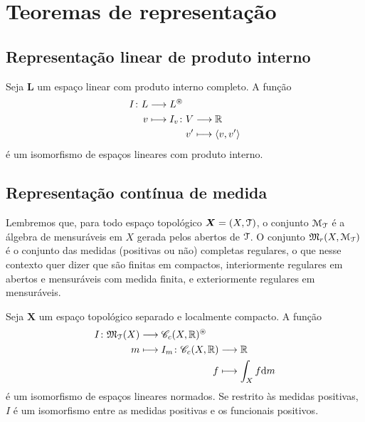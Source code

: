 \section{Teoremas de representação}

\subsection{Representação linear de produto interno}

\begin{proposition}
Seja $\bm L$ um espaço linear com produto interno completo. A função
	\begin{align*}
	\func{I}{L}{L^\circledast}{v}{
		\begin{aligned}[t]
		\func{I_v}{V}{\R}{v'}{\inte{v}{v'}}
		\end{aligned}
	}
	\end{align*}
é um isomorfismo de espaços lineares com produto interno.
\end{proposition}

\subsection{Representação contínua de medida}

Lembremos que, para todo espaço topológico $\bm X = (X,\mathcal{T})$, o conjunto $\mathcal{M}_{\mathcal{T}}$ é a álgebra de mensuráveis em $X$ gerada pelos abertos de $\mathcal{T}$. O conjunto $\mathfrak{M}_r(X,\mathcal{M}_{\mathcal{T}})$ é o conjunto das medidas (positivas ou não) completas regulares, o que nesse contexto quer dizer que são finitas em compactos, interiormente regulares em abertos e mensuráveis com medida finita, e exteriormente regulares em mensuráveis.


\begin{proposition}
Seja $\bm X$ um espaço topológico separado e localmente compacto. A função
	\begin{align*}
	\func{I}{\Med_\topo(X)}{\Cont_c(X,\R)^\circledast}{\med}{
		\begin{aligned}[t]
		\func{I_\med}{\Cont_c(X,\R)}{\R}{f}{\int_X f \dd \med}
		\end{aligned}
	}
	\end{align*}
é um isomorfismo de espaços lineares normados. Se restrito às medidas positivas, $I$ é um isomorfismo entre as medidas positivas e os funcionais positivos.
\end{proposition}